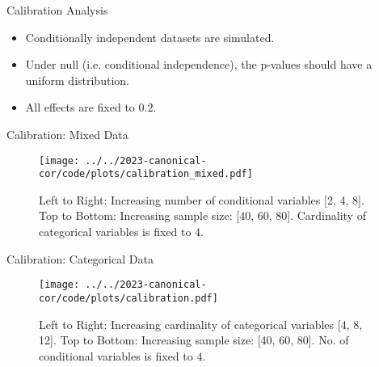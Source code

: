 \documentclass{beamer}
\begin{document}
\begin{frame}{Calibration Analysis}

\begin{center}
\end{center}

\begin{itemize}
	\item Conditionally independent datasets are simulated.
	\item Under null (i.e. conditional independence), the p-values should
		have a uniform distribution.
	\item All effects are fixed to $ 0.2 $.
\end{itemize}

\end{frame}

\begin{frame}{Calibration: Mixed Data}
	\begin{figure}[t]
		\centering
		\texttt{[image: ../../2023-canonical-cor/code/plots/calibration\_mixed.pdf]}
		\caption*{\footnotesize{Left to Right: Increasing number of conditional variables [2, 4, 8]. Top to Bottom: Increasing sample size: [40, 60, 80]. Cardinality of categorical variables is fixed to $ 4 $.}}
	\end{figure}
\end{frame}

\begin{frame}{Calibration: Categorical Data}
	\begin{figure}[t]
		\centering
		\texttt{[image: ../../2023-canonical-cor/code/plots/calibration.pdf]}
		\caption*{\footnotesize{Left to Right: Increasing cardinality of categorical variables [4, 8, 12]. Top to Bottom: Increasing sample size: [40, 60, 80]. No. of conditional variables is fixed to $ 4 $.}}
	\end{figure}
\end{frame}
\end{document}
